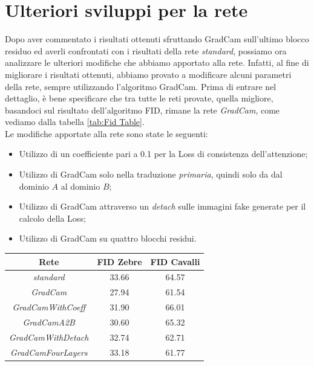 \section{Ulteriori sviluppi per la rete}
Dopo aver commentato i risultati ottenuti sfruttando GradCam sull'ultimo blocco residuo ed averli confrontati con i risultati della rete \emph{standard}, possiamo ora analizzare le ulteriori modifiche che abbiamo apportato alla rete. Infatti, al fine di migliorare i risultati ottenuti, abbiamo provato a modificare alcuni parametri della rete, sempre utilizzando l'algoritmo GradCam. Prima di entrare nel dettaglio, è bene specificare che tra tutte le reti provate, quella migliore, basandoci sul risultato dell'algoritmo FID, rimane la rete \emph{GradCam}, come vediamo dalla tabella \ref{tab:Fid Table}.
\\Le modifiche apportate alla rete sono state le seguenti:
\begin{itemize}
\item Utilizzo di un coefficiente pari a 0.1 per la Loss di consistenza dell'attenzione;
\item Utilizzo di GradCam solo nella traduzione \emph{primaria}, quindi solo da dal dominio $A$ al dominio $B$;
\item Utilizzo di GradCam attraverso un \emph{detach} sulle immagini fake generate per il calcolo della Loss;
\item Utilizzo di GradCam su quattro blocchi residui.
\end{itemize}



\begin{center}
\begin{tabular}{ | c | c | c | }
\hline
\textbf{Rete}          & \textbf{FID Zebre}        &   \textbf{FID Cavalli}    \\
\hline
\emph{standard}          & 33.66     & 64.57  \\ \hline
\emph{GradCam}           & 27.94     & 61.54  \\ \hline
\emph{GradCamWithCoeff}  & 31.90     & 66.01  \\ \hline
\emph{GradCamA2B}        & 30.60     & 65.32  \\ \hline
\emph{GradCamWithDetach} & 32.74     & 62.71  \\ \hline
\emph{GradCamFourLayers}   & 33.18     & 61.77  \\ \hline
\end{tabular}
\label{tab:Fid Table}
\end{center}

